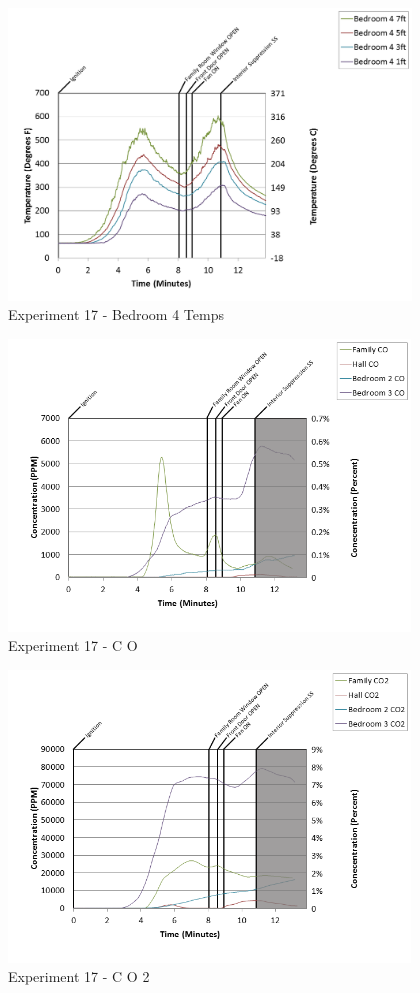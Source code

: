 \documentclass{article}
\begin{document}
\begin{appendices}
\begin{figure}[h!]
	\centering
	\includegraphics[height=3.05in]{0_Images/Results_Charts/Exp_17_Charts/Bedroom4Temps.png}
	\caption{Experiment 17 - Bedroom 4 Temps}
\end{figure}

\clearpage

\begin{figure}[h!]
	\centering
	\includegraphics[height=3.05in]{0_Images/Results_Charts/Exp_17_Charts/CO.png}
	\caption{Experiment 17 - C O}
\end{figure}


\begin{figure}[h!]
	\centering
	\includegraphics[height=3.05in]{0_Images/Results_Charts/Exp_17_Charts/CO2.png}
	\caption{Experiment 17 - C O 2}
\end{figure}


\end{appendices}
\end{document}
